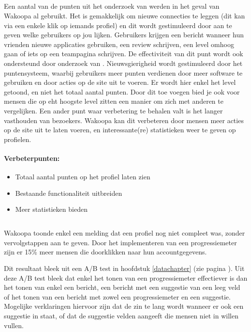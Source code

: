 \documentclass[a4paper, 10pt, pdftex]{report}
\begin{document}
    \subsection{\cite{Berlanga2007}}
    Een aantal van de punten uit het onderzoek van \citeauthor{Berlanga2007} werden in het geval van Wakoopa al gebruikt. Het is gemakkelijk om nieuwe connecties te leggen (dit kan via een enkele klik op iemands profiel) en dit wordt gestimuleerd door aan te geven welke gebruikers op jou lijken. Gebruikers krijgen een bericht wanneer hun vrienden nieuwe applicaties gebruiken, een review schrijven, een level omhoog gaan of iets op een teampagina schrijven. De effectiviteit van dit punt wordt ook ondersteund door onderzoek van \cite{Berlanga2007}. Nieuwsgierigheid wordt gestimuleerd door het puntensysteem, waarbij gebruikers meer punten verdienen door meer software te gebruiken en door acties op de site uit te voeren. Er wordt hier enkel het level getoond, en niet het totaal aantal punten. Door dit toe voegen bied je ook voor mensen die op eht hoogste level zitten een manier om zich met anderen te vergelijken. Een ander punt waar verbetering te behalen valt is het langer vasthouden van bezoekers. Wakoopa kan dit verbeteren door mensen meer acties op de site uit te laten voeren, en interessante(re) statistieken weer te geven op profielen.

      \paragraph{\textbf{Verbeterpunten:}}
      \begin{itemize}
        \item Totaal aantal punten op het profiel laten zien
        \item Bestaande functionaliteit uitbreiden
        \item Meer statistieken bieden
      \end{itemize}

    \subsection{\cite{Brouns2008}}
    \label{wak:Brouns2008}
    Wakoopa toonde enkel een melding dat een profiel nog niet compleet was, zonder vervolgstappen aan te geven. Door het implementeren van een progressiemeter zijn er 15\% meer mensen die doorklikken naar hun accountgegevens.

    Dit resultaat bleek uit een A/B test in hoofdstuk \ref{datachapter} (zie pagina \pageref{profileprogress}). Uit deze A/B test bleek dat enkel het tonen van een progressiemeter effectiever is dan het tonen van enkel een bericht, een bericht met een suggestie van een leeg veld of het tonen van een bericht met zowel een progressiemeter en een suggestie. Mogelijke verklaringen hiervoor zijn dat de zin te lang wordt wanneer er ook een suggestie in staat, of dat de suggestie velden aangeeft die mensen niet in willen vullen.
\end{document}
